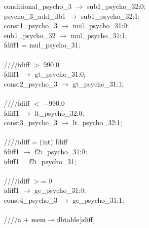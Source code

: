    \hspace*{2em}conditional\_psycho\_3 $\rightarrow$ sub1\_psycho\_32:0; \\
   \hspace*{2em}psycho\_3\_add\_db1 $\rightarrow$ sub1\_psycho\_32:1; \\
   \hspace*{2em}const1\_psycho\_3 $\rightarrow$ mul\_psycho\_31:0; \\
   \hspace*{2em}sub1\_psycho\_32 $\rightarrow$ mul\_psycho\_31:1; \\
   \hspace*{2em}fdiff1 = mul\_psycho\_31; \\
   \\
   \hspace*{2em}////fdiff $>$ 990.0 \\
   \hspace*{2em}fdiff1 $\rightarrow$ gt\_psycho\_31:0; \\
   \hspace*{2em}const2\_psycho\_3 $\rightarrow$ gt\_psycho\_31:1; \\
   \\
   \hspace*{2em}////fdiff $<$ $-$990.0 \\
   \hspace*{2em}fdiff1 $\rightarrow$ lt\_psycho\_32:0; \\
   \hspace*{2em}const3\_psycho\_3 $\rightarrow$ lt\_psycho\_32:1; \\
   \\
   \hspace*{2em}////idiff = (int) fdiff \\
   \hspace*{2em}fdiff1 $\rightarrow$ f2i\_psycho\_31:0; \\
   \hspace*{2em}idiff1 = f2i\_psycho\_31; \\
   \\
   \hspace*{2em}////idiff $>$= 0 \\
   \hspace*{2em}idiff1 $\rightarrow$ ge\_psycho\_31:0; \\
   \hspace*{2em}const4\_psycho\_3 $\rightarrow$ ge\_psycho\_31:1; \\
   \\
   \hspace*{2em}////a + mem$\rightarrow$dbtable[idiff] \\
